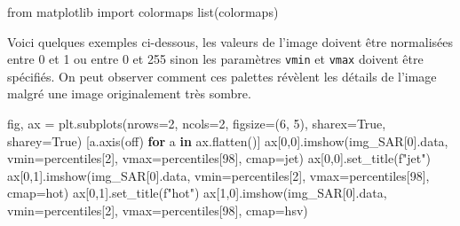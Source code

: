 \documentclass[
  french,
  11pt,
  letterpaper,
  open=any,
  twoside=false,
  french]{scrbook}
\newenvironment{Shaded}{\begin{snugshade}}{\end{snugshade}}
\newcommand{\BuiltInTok}[1]{\textcolor[rgb]{0.00,0.23,0.31}{#1}}
\newcommand{\ControlFlowTok}[1]{\textcolor[rgb]{0.00,0.23,0.31}{\textbf{#1}}}
\newcommand{\DecValTok}[1]{\textcolor[rgb]{0.68,0.00,0.00}{#1}}
\newcommand{\ImportTok}[1]{\textcolor[rgb]{0.00,0.46,0.62}{#1}}
\newcommand{\KeywordTok}[1]{\textcolor[rgb]{0.00,0.23,0.31}{\textbf{#1}}}
\newcommand{\NormalTok}[1]{\textcolor[rgb]{0.00,0.23,0.31}{#1}}
\newcommand{\OperatorTok}[1]{\textcolor[rgb]{0.37,0.37,0.37}{#1}}
\newcommand{\SpecialStringTok}[1]{\textcolor[rgb]{0.13,0.47,0.30}{#1}}
\newcommand{\StringTok}[1]{\textcolor[rgb]{0.13,0.47,0.30}{#1}}
\newcommand{\VariableTok}[1]{\textcolor[rgb]{0.07,0.07,0.07}{#1}}
\begin{document}
\begin{Shaded}
\begin{Highlighting}[]
\ImportTok{from}\NormalTok{ matplotlib }\ImportTok{import}\NormalTok{ colormaps}
\BuiltInTok{list}\NormalTok{(colormaps)}
\end{Highlighting}
\end{Shaded}

Voici quelques exemples ci-dessous, les valeurs de l'image doivent être
normalisées entre 0 et 1 ou entre 0 et 255 sinon les paramètres
\texttt{vmin} et \texttt{vmax} doivent être spécifiés. On peut observer
comment ces palettes révèlent les détails de l'image malgré une image
originalement très sombre.

\begin{Shaded}
\begin{Highlighting}[]
\NormalTok{fig, ax }\OperatorTok{=}\NormalTok{ plt.subplots(nrows}\OperatorTok{=}\DecValTok{2}\NormalTok{, ncols}\OperatorTok{=}\DecValTok{2}\NormalTok{, figsize}\OperatorTok{=}\NormalTok{(}\DecValTok{6}\NormalTok{, }\DecValTok{5}\NormalTok{), sharex}\OperatorTok{=}\VariableTok{True}\NormalTok{, sharey}\OperatorTok{=}\VariableTok{True}\NormalTok{)}
\NormalTok{[a.axis(}\StringTok{\textquotesingle{}off\textquotesingle{}}\NormalTok{) }\ControlFlowTok{for}\NormalTok{ a }\KeywordTok{in}\NormalTok{ ax.flatten()]}
\NormalTok{ax[}\DecValTok{0}\NormalTok{,}\DecValTok{0}\NormalTok{].imshow(img\_SAR[}\DecValTok{0}\NormalTok{].data, vmin}\OperatorTok{=}\NormalTok{percentiles[}\DecValTok{2}\NormalTok{], vmax}\OperatorTok{=}\NormalTok{percentiles[}\DecValTok{98}\NormalTok{], cmap}\OperatorTok{=}\StringTok{\textquotesingle{}jet\textquotesingle{}}\NormalTok{)}
\NormalTok{ax[}\DecValTok{0}\NormalTok{,}\DecValTok{0}\NormalTok{].set\_title(}\SpecialStringTok{f"jet"}\NormalTok{)}
\NormalTok{ax[}\DecValTok{0}\NormalTok{,}\DecValTok{1}\NormalTok{].imshow(img\_SAR[}\DecValTok{0}\NormalTok{].data, vmin}\OperatorTok{=}\NormalTok{percentiles[}\DecValTok{2}\NormalTok{], vmax}\OperatorTok{=}\NormalTok{percentiles[}\DecValTok{98}\NormalTok{], cmap}\OperatorTok{=}\StringTok{\textquotesingle{}hot\textquotesingle{}}\NormalTok{)}
\NormalTok{ax[}\DecValTok{0}\NormalTok{,}\DecValTok{1}\NormalTok{].set\_title(}\SpecialStringTok{f"hot"}\NormalTok{)}
\NormalTok{ax[}\DecValTok{1}\NormalTok{,}\DecValTok{0}\NormalTok{].imshow(img\_SAR[}\DecValTok{0}\NormalTok{].data, vmin}\OperatorTok{=}\NormalTok{percentiles[}\DecValTok{2}\NormalTok{], vmax}\OperatorTok{=}\NormalTok{percentiles[}\DecValTok{98}\NormalTok{], cmap}\OperatorTok{=}\StringTok{\textquotesingle{}hsv\textquotesingle{}}\NormalTok{)}

\end{Highlighting}
\end{Shaded}
\end{document}

